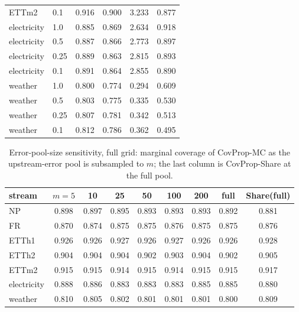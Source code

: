 \documentclass[10pt]{article}
\begin{document}
\begin{table}[h]
\begin{tabular}{llcccc}
ETTm2 & 0.1 & 0.916 & 0.900 & 3.233 & 0.877 \\
electricity & 1.0 & 0.885 & 0.869 & 2.634 & 0.918 \\
electricity & 0.5 & 0.887 & 0.866 & 2.773 & 0.897 \\
electricity & 0.25 & 0.889 & 0.863 & 2.815 & 0.893 \\
electricity & 0.1 & 0.891 & 0.864 & 2.855 & 0.890 \\
weather & 1.0 & 0.800 & 0.774 & 0.294 & 0.609 \\
weather & 0.5 & 0.803 & 0.775 & 0.335 & 0.530 \\
weather & 0.25 & 0.807 & 0.781 & 0.342 & 0.513 \\
weather & 0.1 & 0.812 & 0.786 & 0.362 & 0.495 \\
\bottomrule
\end{tabular}
\end{table}
\begin{table}[h]\centering\small
\caption{Error-pool-size sensitivity, full grid: marginal coverage of CovProp-MC as the upstream-error pool is subsampled to $m$; the last column is CovProp-Share at the full pool.}
\begin{tabular}{lcccccccc}
\toprule
stream & $m{=}5$ & 10 & 25 & 50 & 100 & 200 & full & Share(full) \\
\midrule
NP & 0.898 & 0.897 & 0.895 & 0.893 & 0.893 & 0.893 & 0.892 & 0.881 \\
FR & 0.870 & 0.874 & 0.875 & 0.875 & 0.876 & 0.875 & 0.875 & 0.876 \\
ETTh1 & 0.926 & 0.926 & 0.927 & 0.926 & 0.927 & 0.926 & 0.926 & 0.928 \\
ETTh2 & 0.904 & 0.904 & 0.904 & 0.902 & 0.903 & 0.904 & 0.902 & 0.905 \\
ETTm2 & 0.915 & 0.915 & 0.914 & 0.915 & 0.914 & 0.915 & 0.915 & 0.917 \\
electricity & 0.888 & 0.886 & 0.883 & 0.883 & 0.883 & 0.885 & 0.885 & 0.880 \\
weather & 0.810 & 0.805 & 0.802 & 0.801 & 0.801 & 0.801 & 0.800 & 0.809 \\
\bottomrule
\end{tabular}
\end{table}
\end{document}
